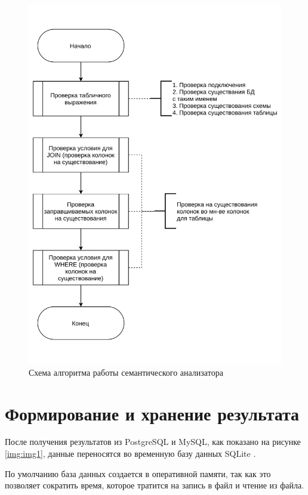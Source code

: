 \begin{figure}[h!]
	\begin{center}
		\includegraphics[scale=0.73]{./inc/img/schema3.pdf}
		\caption{Схема алгоритма работы семантического анализатора}
		\label{img:schema3}
	\end{center}
\end{figure}

\section{Формирование и хранение результата}

После получения результатов из PostgreSQL и MySQL, как показано на рисунке \ref{img:img1}, данные переносятся во временную базу данных SQLite \cite{sqlite-standard}.

По умолчанию база данных создается в оперативной памяти, так как это позволяет сократить время, которое тратится на запись в файл и чтение из файла.

